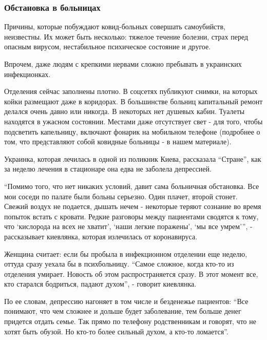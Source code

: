  
 
 
 
 

\subsubsection{Обстановка в больницах}
\label{sec:23_11_2020.news.ua.strana.1.covid_suicides_ukr.obstanovka_v_bolnicah}

Причины, которые побуждают ковид-больных совершать самоубийств,
неизвестны. Их может быть несколько: тяжелое течение болезни, страх перед
опасным вирусом, нестабильное психическое состояние и другое. 

Впрочем, даже людям с крепкими нервами сложно пребывать в украинских
инфекционках. 

Отделения сейчас заполнены плотно. В соцсетях публикуют снимки, на которых
койки размещают даже в коридорах. В большинстве больниц капитальный ремонт
делался очень давно или никогда. В некоторых нет душевых кабин. Туалеты
находятся в ужасном состоянии. Местами даже отсутствует свет - для того,
чтобы подсветить капельницу, включают фонарик на мобильном телефоне
(подробнее о том, что представляют собой ковидные больницы - в нашем
материале). 

Украинка, которая лечилась в одной из поликник Киева, рассказала \enquote{Стране}, как
за неделю лечения в стационаре она едва не заболела депрессией.

\enquote{Помимо того, что нет никаких условий, давит сама больничная обстановка.
Все мои соседи по палате были больны серьезно. Один плачет, второй стонет.
Свежий воздух не подается, дышать нечем - некоторые теряют сознание во
время попыток встать с кровати. Редкие разговоры между пациентами сводятся
к тому, что \enquote{кислорода на всех не хватит}, \enquote{наши легкие поражены}, 
\enquote{мы все умрем}}, - рассказывает киевлянка, которая излечилась от коронавируса. 

Женщина считает: если бы пробыла в инфекционном отделении еще неделю,
оттуда сразу уехала бы в психбольницу. \enquote{Самое сложное, когда кто-то из
отделения умирает. Новость об этом распространяется сразу. В этот момент
все, кто старался бодриться, падают духом}, - говорит киевлянка. 

По ее словам, депрессию нагоняет в том числе и безденежье пациентов: \enquote{Все
понимают, что чем сложнее и дольше будет заболевание, тем больше денег
придется отдать семье. Так прямо по телефону родственникам и говорят, что
не хотят быть обузой. Но кто-то более сильный духом, а кто-то ломается}. 


